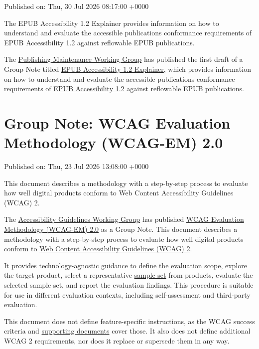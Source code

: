 \documentclass[11pt,a4paper]{article}
\begin{document}
Published on: Thu, 30 Jul 2026 08:17:00 +0000

The EPUB Accessibility 1.2 Explainer provides information on how to understand and evaluate the accessible publications conformance requirements of EPUB Accessibility 1.2 against reflowable EPUB publications.

The \href{https://www.w3.org/groups/wg/pm/}{Publishing Maintenance Working Group} has published the first draft of a Group Note titled \href{https://www.w3.org/TR/2026/DNOTE-epub-a11y-explain-12-20260730/}{EPUB Accessibility 1.2 Explainer}, which provides information on how to understand and evaluate the accessible publications conformance requirements of \href{https://www.w3.org/TR/epub-a11y-12/}{EPUB Accessibility 1.2} against reflowable EPUB publications.

\section{Group Note: WCAG Evaluation Methodology (WCAG-EM) 2.0}

Published on: Thu, 23 Jul 2026 13:08:00 +0000

This document describes a methodology with a step-by-step process to evaluate how well digital products conform to Web Content Accessibility Guidelines (WCAG) 2.

The \href{https://www.w3.org/groups/wg/ag/}{Accessibility Guidelines Working Group} has published \href{https://www.w3.org/TR/2026/NOTE-wcag-em-2-20260723/}{WCAG Evaluation Methodology (WCAG-EM) 2.0} as a Group Note. This document describes a methodology with a step-by-step process to evaluate how well digital products conform to \href{https://www.w3.org/WAI/standards-guidelines/wcag/}{Web Content Accessibility Guidelines (WCAG) 2}.

It provides technology-agnostic guidance to define the evaluation scope, explore the target product, select a representative \href{https://www.w3.org/TR/2026/NOTE-wcag-em-2-20260723/\#dfn-sample-set}{sample set} from products, evaluate the selected sample set, and report the evaluation findings. This procedure is suitable for use in different evaluation contexts, including self-assessment and third-party evaluation.

This document does not define feature-specific instructions, as the WCAG success criteria and \href{https://www.w3.org/WAI/standards-guidelines/wcag/docs/}{supporting documents} cover those. It also does not define additional WCAG 2 requirements, nor does it replace or supersede them in any way.
\end{document}

